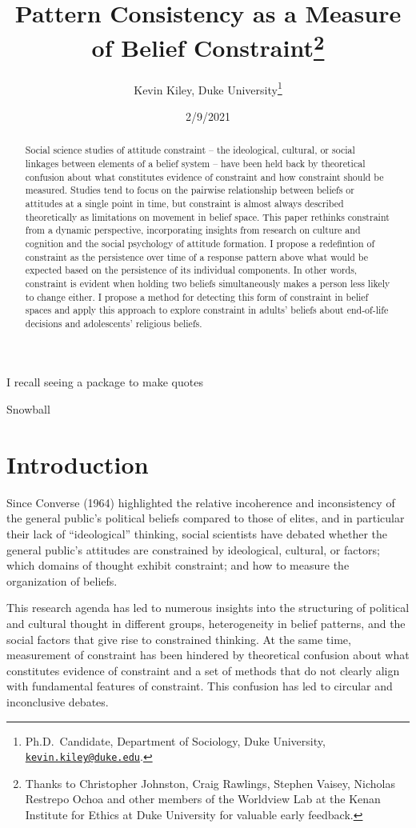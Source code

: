 \documentclass[12pt,]{article}
\title{Pattern Consistency as a Measure of Belief Constraint\footnote{Thanks to Christopher Johnston, Craig Rawlings, Stephen Vaisey, Nicholas Restrepo Ochoa and other members of the Worldview Lab at the Kenan Institute for Ethics at Duke University for valuable early feedback.}}
\author{Kevin Kiley, Duke University\footnote{Ph.D.~Candidate, Department of Sociology, Duke University, \href{mailto:kevin.kiley@duke.edu}{\nolinkurl{kevin.kiley@duke.edu}}.}}
\date{2/9/2021}
\begin{document}
\maketitle
\begin{abstract}
Social science studies of attitude constraint -- the ideological, cultural, or social linkages between elements of a belief system -- have been held back by theoretical confusion about what constitutes evidence of constraint and how constraint should be measured. Studies tend to focus on the pairwise relationship between beliefs or attitudes at a single point in time, but constraint is almost always described theoretically as limitations on movement in belief space. This paper rethinks constraint from a dynamic perspective, incorporating insights from research on culture and cognition and the social psychology of attitude formation. I propose a redefintion of constraint as the persistence over time of a response pattern above what would be expected based on the persistence of its individual components. In other words, constraint is evident when holding two beliefs simultaneously makes a person less likely to change either. I propose a method for detecting this form of constraint in belief spaces and apply this approach to explore constraint in adults' beliefs about end-of-life decisions and adolescents' religious beliefs.
\end{abstract}

\epigraph{I recall seeing a package to make quotes}{Snowball}

\hypertarget{introduction}{%
\section{Introduction}\label{introduction}}

Since Converse (1964) highlighted the relative incoherence and inconsistency of the general public's political beliefs compared to those of elites, and in particular their lack of ``ideological'' thinking, social scientists have debated whether the general public's attitudes are constrained by ideological, cultural, or factors; which domains of thought exhibit constraint; and how to measure the organization of beliefs.

This research agenda has led to numerous insights into the structuring of political and cultural thought in different groups, heterogeneity in belief patterns, and the social factors that give rise to constrained thinking. At the same time, measurement of constraint has been hindered by theoretical confusion about what constitutes evidence of constraint and a set of methods that do not clearly align with fundamental features of constraint. This confusion has led to circular and inconclusive debates.
\end{document}
